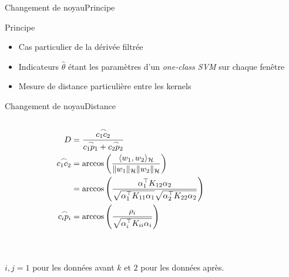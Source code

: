 \begin{frame}{Changement de noyau}{Principe}

\begin{block}{Principe}
\vspace{-.7em}
\begin{itemize}
\item Cas particulier de la dérivée filtrée
\item Indicateurs $\hat{\theta}$ étant les paramètres d'un \textit{one-class SVM} sur chaque fenêtre
\item Mesure de distance particulière entre les kernels
\end{itemize}
\end{block}

\end{frame}

\begin{frame}{Changement de noyau}{Distance}

\begin{columns}
\begin{column}{.47\textwidth}
\small
\begin{align}
  D &= \frac{\overset{\frown}{c_1 c_2}}{\overset{\frown}{c_1 p_1} + \overset{\frown}{c_2 p_2}} \notag \\
  \overset{\frown}{c_1 c_2} &= \arccos\left(\frac{
    	\langle w_1, w_2\rangle_\mathcal{H}
    	}{
    	\|w_1\|_\mathcal{H}\|w_2\|_\mathcal{H}
    	} \right) \notag \\
   &= \arccos\left(\frac{
  	\alpha_1^\top K_{12} \alpha_2
  	}{
  	\sqrt{\alpha_1^\top K_{11} \alpha_1} \sqrt{\alpha_2^\top K_{22} \alpha_2}
  	} \right) \notag \\
  \overset{\frown}{c_i p_i} &= \arccos\left( \frac{\rho_i}{\sqrt{\alpha_i^\top K_{ii} \alpha_i}}  \right) \notag
\end{align}

~\\~\\
$i, j = 1$ pour les données avant $k$ et $2$ pour les données après.

\end{column}
\begin{column}{.47\textwidth}


\end{column}
\end{columns}
\end{frame}
